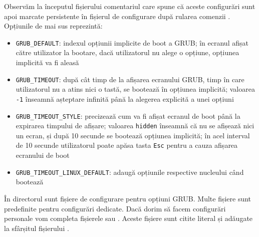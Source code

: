 
Observăm la începutul fișierului comentariul care spune că aceste configurări
sunt apoi marcate persistente în fișierul de configurare 
după rularea comenzii . Opțiunile de mai sus reprezintă:

\begin{itemize}
  \item \texttt{GRUB\_DEFAULT}: indexul opțiunii implicite de boot a GRUB; în
		ecranul afișat către utilizator la bootare, dacă utilizatorul nu
		alege o opțiune, opțiunea implicită va fi aleasă
  \item \texttt{GRUB\_TIMEOUT}: după cât timp de la afișarea ecranului GRUB, timp în
		care utilizatorul nu a atins nici o tastă, se bootează în
                opțiunea implicită; valoarea \texttt{-1} înseamnă așteptare infinită până la alegerea explicită a unei opțiuni
  \item \texttt{GRUB\_TIMEOUT\_STYLE}: precizează cum va fi afișat ecranul de boot
    până la expirarea timpului de afișare; valoarea \texttt{hidden}
		înseamnă că nu se afișează nici un ecran, și după 10 secunde se
		bootează opțiunea implicită; în acel interval de 10 secunde
                utilizatorul poate apăsa tasta \texttt{Esc} pentru a cauza afișarea
		ecranului de boot
  \item \texttt{GRUB\_TIMEOUT\_LINUX\_DEFAULT}: adaugă opțiunile respective nucleului
		când bootează
\end{itemize}

În directorul  sunt fișiere de configurare pentru opțiuni GRUB.
Multe fișiere sunt predefinite pentru configurări dedicate. Dacă dorim să facem
configurări personale vom completa fișierele  sau
. Aceste fișiere sunt citite literal și adăugate la
sfârșitul fișierului .

